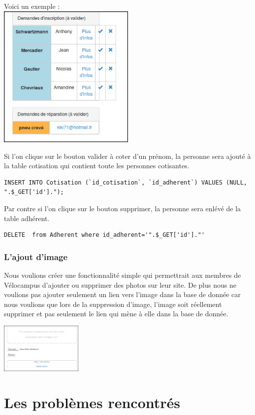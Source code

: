 \documentclass[11pt,a4paper,titlepage]{report}
\begin{document}
Voici un exemple :\\
\includegraphics[width=0.5\textwidth]{demande.jpg}~

Si l'on clique sur le bouton valider à coter d'un prénom, la personne sera ajouté à la table cotisation qui contient toute les personnes cotisantes.
\begin{verbatim}
INSERT INTO Cotisation (`id_cotisation`, `id_adherent`) VALUES (NULL, ".$_GET['id'].");
\end{verbatim} 
Par contre si l'on clique sur le bouton supprimer, la personne sera enlévé de la table adhérent.
\begin{verbatim}
DELETE  from Adherent where id_adherent='".$_GET['id']."'
\end{verbatim}

\subsection{L'ajout d'image}
Nous voulions créer une fonctionnalité simple qui permettrait aux membres de Vélocampus d'ajouter ou supprimer des photos sur leur site. De plus nous ne voulions pas ajouter seulement un lien vers l'image dans la base de donnée car nous voulions que lors de la suppression d'image, l'image soit réellement supprimer et pas seulement le lien qui mène à elle dans la base de donnée.
\begin{center}
\includegraphics[width=0.3\textwidth]{addImage.jpg}~
\end{center}



\chapter{Les problèmes rencontrés}
\end{document}

